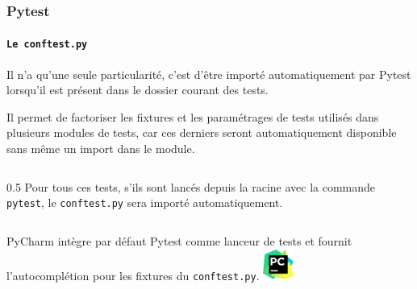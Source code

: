 \documentclass{beamer}
\begin{document}
    \begin{frame}
        \frametitle{Pytest}
        \framesubtitle{\lstinline{Le conftest.py}}
        \transdissolve
        Il n'a qu'une seule particularité, c'est d'être importé automatiquement par Pytest lorsqu'il est présent dans le dossier courant des tests.

        Il permet de factoriser les fixtures et les paramétrages de tests utilisés dans plusieurs modules de tests, car ces derniers seront automatiquement disponible sans même un import dans le module.
        \begin{columns}
            \column
            {0.5\textwidth}
            Pour tous ces tests, s'ils sont lancés depuis la racine avec la commande \lstinline{pytest}, le \lstinline{conftest.py} sera importé automatiquement.
        \end{columns}
        \bigbreak
        \begin{columns}
            PyCharm intègre par défaut Pytest comme lanceur de tests et fournit l'autocomplétion pour les fixtures du \lstinline{conftest.py}.
            \centering
            \includegraphics[width=1cm]{image/logo-pycharm.png}
        \end{columns}
    \end{frame}
\end{document}
